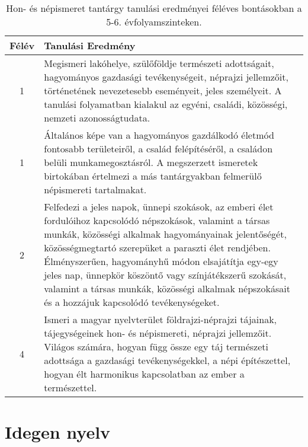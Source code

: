        
           \begin{longtable}{c | p{12cm} }
            \caption[Hon- és népismeret 5-6.]{Hon- és népismeret tantárgy tanulási eredményei féléves bontásokban a 5-6. évfolyamszinteken. }  \\

            \textbf{Félév} & \textbf{Tanulási Eredmény} \\
            \hline
            \endhead
                                
                                          1 &  Megismeri lakóhelye, szülőföldje természeti adottságait, hagyományos gazdasági tevékenységeit, néprajzi jellemzőit, történetének nevezetesebb eseményeit, jeles személyeit. A tanulási folyamatban kialakul az egyéni, családi, közösségi, nemzeti azonosságtudata. \\ \hline
                                          1 &  Általános képe van a hagyományos gazdálkodó életmód fontosabb területeiről, a család felépítéséről, a családon belüli munkamegosztásról. A megszerzett ismeretek birtokában értelmezi a más tantárgyakban felmerülő népismereti tartalmakat. \\ \hline
                                      
                                
                                          2 &  Felfedezi a jeles napok, ünnepi szokások, az emberi élet fordulóihoz kapcsolódó népszokások, valamint a társas munkák, közösségi alkalmak hagyományainak jelentőségét, közösségmegtartó szerepüket a paraszti élet rendjében. Élményszerűen, hagyományhű módon elsajátítja egy-egy jeles nap, ünnepkör köszöntő vagy színjátékszerű szokását, valamint a társas munkák, közösségi alkalmak népszokásait és a hozzájuk kapcsolódó tevékenységeket. \\ \hline
                                      
                                
                                          4 &  Ismeri a magyar nyelvterület földrajzi-néprajzi tájainak, tájegységeinek hon- és népismereti, néprajzi jellemzőit. Világos számára, hogyan függ össze egy táj természeti adottsága a gazdasági tevékenységekkel, a népi építészettel, hogyan élt harmonikus kapcsolatban az ember a természettel. \\ \hline
                                      
                        \end{longtable}
            \clearpage

        \section{Idegen nyelv}


